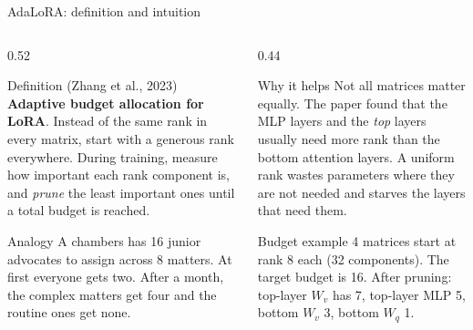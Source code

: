 \documentclass[aspectratio=169,11pt]{beamer}
\begin{document}
\begin{frame}{AdaLoRA: definition and intuition}
  \begin{columns}[T]
    \begin{column}{0.52\textwidth}
      \begin{block}{Definition (Zhang et al., 2023)}
        \small
        \textbf{Adaptive budget allocation for LoRA}. Instead of the same rank in every matrix, start with a generous rank everywhere.
        During training, measure how important each rank component is, and \emph{prune} the least important ones until a total budget is reached.
      \end{block}
      \begin{exampleblock}{Analogy}
        \small
        A chambers has 16 junior advocates to assign across 8 matters. At first everyone gets two. After a month, the complex matters get four and the routine ones get none.
      \end{exampleblock}
    \end{column}
    \begin{column}{0.44\textwidth}
      \begin{block}{Why it helps}
        \small
        Not all matrices matter equally. The paper found that the MLP layers and the \emph{top} layers usually need more rank than the bottom attention layers.
        A uniform rank wastes parameters where they are not needed and starves the layers that need them.
      \end{block}
      \begin{exampleblock}{Budget example}
        \small
        4 matrices start at rank 8 each (32 components). The target budget is 16.
        After pruning: top-layer $W_v$ has 7, top-layer MLP 5, bottom $W_v$ 3, bottom $W_q$ 1.
      \end{exampleblock}
    \end{column}
  \end{columns}
\end{frame}
\end{document}
